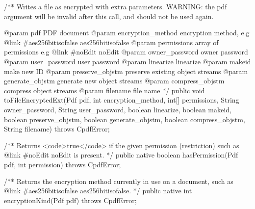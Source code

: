 /** Writes a file as encrypted with extra parameters. WARNING: the pdf
argument will be invalid after this call, and should not be used again.

@param pdf PDF document
@param encryption_method encryption method, e.g
  {@link #aes256bitisofalse aes256bitisofalse} 
@param permissions array of permissions e.g {@link #noEdit noEdit}
@param owner_password owner password
@param user_password user password
@param linearize linearize
@param makeid make new ID
@param preserve_objstm preserve existing object streams
@param generate_objstm generate new object streams
@param compress_objstm compress object streams
@param filename file name */
public void toFileEncryptedExt(Pdf pdf, int encryption_method,
                               int[] permissions, String owner_password,
                               String user_password, boolean linearize,
                               boolean makeid, boolean preserve_objstm,
                               boolean generate_objstm,
                               boolean compress_objstm, String filename)
    throws CpdfError;

/** Returns <code>true</code> if the given permission (restriction) such as
{@link #noEdit noEdit} is present. */
public native boolean hasPermission(Pdf pdf, int permission)
    throws CpdfError;

/** Returns the encryption method currently in use on a document, such as
{@link #aes256bitisofalse aes256bitisofalse}. */
public native int encryptionKind(Pdf pdf) throws CpdfError;
